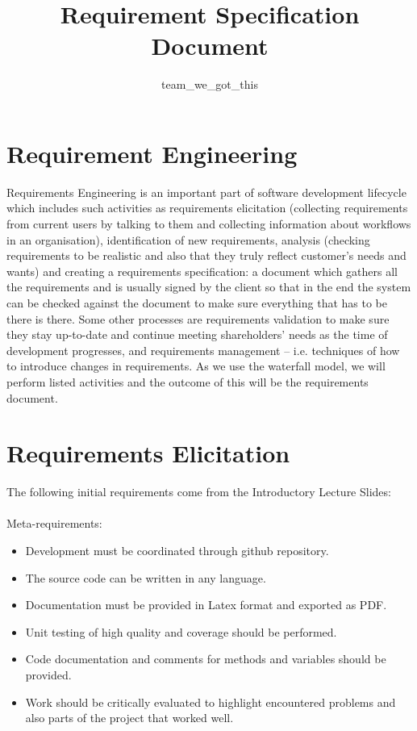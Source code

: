 \documentclass[]{article}
\title{Requirement Specification Document}
\author{team\_we\_got\_this}
\begin{document}
\maketitle


\section*{Requirement Engineering}
Requirements Engineering is an important part of software development lifecycle which includes such activities as requirements elicitation (collecting requirements from current users by talking to them and collecting information about workflows in an organisation), identification of new requirements, analysis (checking requirements to be realistic and also that they truly reflect customer’s needs and wants) and creating a requirements specification: a document which gathers all the requirements and is usually signed by the client so that in the end the system can be checked against the document to make sure everything that has to be there is there. Some other processes are requirements validation to make sure they stay up-to-date and continue meeting shareholders’ needs as the time of development progresses, and requirements management – i.e. techniques of how to introduce changes in requirements. As we use the waterfall model, we will perform listed activities and the outcome of this will be the requirements document. 

\section*{Requirements Elicitation}

The following initial requirements come from the Introductory Lecture Slides:\\\\
Meta-requirements:
\begin{itemize}

\item Development must be coordinated through github repository.
\item The source code can be written in any language.
\item Documentation must be provided in Latex format and exported as PDF.
\item Unit testing of high quality and coverage should be performed.
\item Code documentation and comments for methods and variables should be provided.
\item Work should be critically evaluated to highlight encountered problems and also parts of the project that worked well.
\end{itemize}
\end{document}
